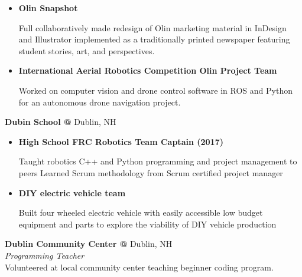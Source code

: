 \documentclass[10pt]{article} %
\begin{document}
\begin{minipage}[t]{0.8\textwidth}
\begin{itemize} [noitemsep,topsep=0pt]
  Developed a full-stack web app in a team with Vue, Python, and MariaDB that coordinates student schedules, pulling information from Google Calendar services and optimizing possible meeting times in a multi-user system.
  \item {}\textbf{Olin Snapshot }

  Full collaboratively made redesign of Olin marketing material in InDesign and Illustrator implemented as a traditionally printed newspaper featuring student stories, art, and perspectives.
  \item {}\textbf{International Aerial Robotics Competition Olin Project Team}

  Worked on computer vision and drone control software in ROS and Python for an autonomous drone navigation project.
  \\
\end{itemize}
\textbf{Dubin School @} \space Dublin, NH\\
\begin{itemize} [noitemsep,topsep=0pt]
  \item {}\textbf{High School FRC Robotics Team Captain (2017)}

  Taught robotics C++ and Python programming and project management to peers Learned Scrum methodology from Scrum certified project manager
  \item {}\textbf{DIY electric vehicle team }

  Built four wheeled electric vehicle with easily accessible low budget equipment and parts to explore the viability of DIY vehicle production
  \\
\end{itemize}
\textbf{Dublin Community Center @} \space Dublin, NH \\
\textit{Programming Teacher}\\
Volunteered at local community center teaching beginner coding program.
\end{minipage}
\hspace{0.5cm}
\end{document}
